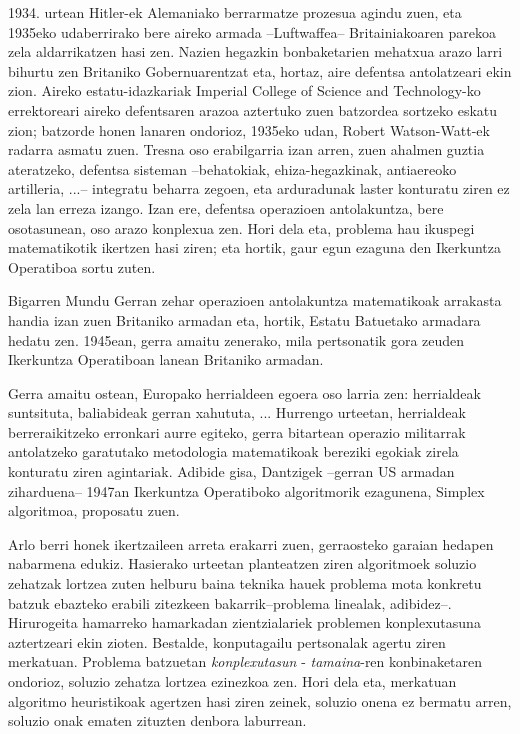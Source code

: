 \documentclass[eu]{ifirak}\usepackage[]{graphicx}\usepackage[]{color}
\newcommand{\zkk}{\guillemotleft}
\newcommand{\skk}{\guillemotright}
\begin{document}
1934. urtean Hitler-ek Alemaniako berrarmatze prozesua agindu zuen, eta 1935eko udaberrirako bere aireko armada --Luftwaffea-- Britainiakoaren parekoa zela aldarrikatzen hasi zen. Nazien hegazkin bonbaketarien mehatxua arazo larri bihurtu zen Britaniko Gobernuarentzat eta, hortaz, aire defentsa antolatzeari ekin zion. Aireko estatu-idazkariak \zkk Imperial College of Science and Technology\skk -ko errektoreari aireko defentsaren arazoa aztertuko zuen batzordea sortzeko eskatu zion; batzorde honen lanaren ondorioz, 1935eko udan, Robert Watson-Watt-ek radarra asmatu zuen. Tresna oso erabilgarria izan arren, zuen ahalmen guztia ateratzeko, defentsa sisteman --behatokiak, ehiza-hegazkinak, antiaereoko artilleria, ...--  integratu beharra zegoen, eta arduradunak laster konturatu ziren ez zela lan erreza izango. Izan ere, defentsa operazioen antolakuntza, bere osotasunean, oso arazo konplexua zen. Hori dela eta, problema hau ikuspegi matematikotik ikertzen hasi ziren; eta hortik, gaur egun ezaguna den Ikerkuntza Operatiboa sortu zuten.

Bigarren Mundu Gerran zehar operazioen antolakuntza \zkk matematikoa\skk k arrakasta handia izan zuen Britaniko armadan eta, hortik, Estatu Batuetako armadara hedatu zen. 1945ean, gerra amaitu zenerako, mila pertsonatik gora zeuden Ikerkuntza Operatiboan lanean Britaniko armadan.

Gerra amaitu ostean, Europako herrialdeen egoera oso larria zen: herrialdeak suntsituta, baliabideak gerran xahututa, ... Hurrengo urteetan, herrialdeak berreraikitzeko erronkari aurre egiteko, gerra bitartean operazio militarrak antolatzeko garatutako metodologia matematikoak bereziki egokiak zirela konturatu ziren agintariak. Adibide gisa, Dantzigek --gerran US armadan ziharduena-- 1947an Ikerkuntza Operatiboko algoritmorik ezagunena, Simplex algoritmoa, proposatu zuen. 

Arlo berri honek ikertzaileen arreta erakarri zuen, gerraosteko garaian hedapen nabarmena edukiz. Hasierako urteetan planteatzen ziren algoritmoek soluzio zehatzak lortzea zuten helburu baina teknika hauek problema mota konkretu batzuk ebazteko erabili zitezkeen bakarrik--problema linealak, adibidez--. Hirurogeita hamarreko hamarkadan zientzialariek problemen konplexutasuna aztertzeari ekin zioten. Bestalde, konputagailu pertsonalak agertu ziren merkatuan. Problema batzuetan \textit{konplexutasun} - \textit{tamaina}-ren konbinaketaren ondorioz, soluzio zehatza lortzea ezinezkoa zen. Hori dela eta, merkatuan algoritmo heuristikoak agertzen hasi ziren zeinek, soluzio onena ez bermatu arren, soluzio onak ematen zituzten denbora laburrean.
\end{document}
